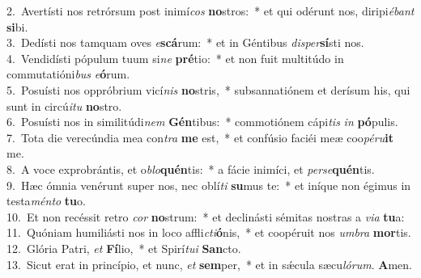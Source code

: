 {2.~}Avertísti nos retrórsum post inimí\textit{cos} \textbf{no}stros:~* et qui odérunt nos, diripi\textit{é}\textit{bant} \textbf{si}bi.\\
{3.~}Dedísti nos tamquam oves \textit{e}\textbf{scá}rum:~* et in Géntibus \textit{di}\textit{sper}\textbf{sí}sti nos.\\
{4.~}Vendidísti pópulum tuum si\textit{ne} \textbf{pré}tio:~* et non fuit multitúdo in commutatióni\textit{bus} \textit{e}\textbf{ó}rum.\\
{5.~}Posuísti nos oppróbrium vicí\textit{nis} \textbf{no}stris,~* subsannatiónem et derísum his, qui sunt in circú\textit{i}\textit{tu} \textbf{no}stro.\\
{6.~}Posuísti nos in similitúdi\textit{nem} \textbf{Gén}tibus:~* commotiónem cápi\textit{tis} \textit{in} \textbf{pó}pulis.\\
{7.~}Tota die verecúndia mea con\textit{tra} \textbf{me} est,~* et confúsio faciéi meæ coo\textit{pé}\textit{ru}\textbf{it} me.\\
{8.~}A voce exprobrántis, et o\textit{blo}\textbf{quén}tis:~* a fácie inimíci, et \textit{per}\textit{se}\textbf{quén}tis.\\
{9.~}Hæc ómnia venérunt super nos, nec oblí\textit{ti} \textbf{su}mus te:~* et iníque non égimus in testa\textit{mén}\textit{to} \textbf{tu}o.\\
{10.~}Et non recéssit retro \textit{cor} \textbf{no}strum:~* et declinásti sémitas nostras a \textit{vi}\textit{a} \textbf{tu}a:\\
{11.~}Quóniam humiliásti nos in loco affli\textit{cti}\textbf{ó}nis,~* et coopéruit nos \textit{um}\textit{bra} \textbf{mor}tis.\\
{12.~}Glória Patri, \textit{et} \textbf{Fí}lio,~* et Spirí\textit{tu}\textit{i} \textbf{San}cto.\\
{13.~}Sicut erat in princípio, et nunc, \textit{et} \textbf{sem}per,~* et in sǽcula sæcu\textit{ló}\textit{rum}. \textbf{A}men.\\
